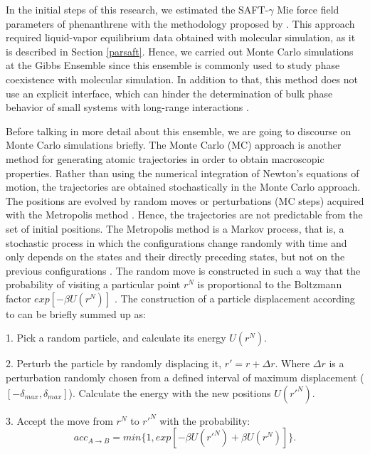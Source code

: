 In the initial steps of this research, we estimated the SAFT-$\gamma$ Mie force field parameters of phenanthrene with the methodology proposed by . This approach required liquid-vapor equilibrium data obtained with molecular simulation, as it is described in Section \ref{parsaft}. Hence, we carried out Monte Carlo simulations at the Gibbs Ensemble \cite{papa1987} since this ensemble is commonly used to study phase coexistence with molecular simulation. In addition to that, this method does not use an explicit interface, which can hinder the determination of bulk phase behavior of small systems with long-range interactions \cite{C1FD00090J}. 

Before talking in more detail about this ensemble, we are going to discourse on Monte Carlo simulations briefly. The Monte Carlo (MC) approach is another method for generating atomic trajectories in order to obtain macroscopic properties. Rather than using the numerical integration of Newton's equations of motion, the trajectories are obtained stochastically in the Monte Carlo approach. The positions are evolved by random moves or perturbations (MC steps) acquired with the Metropolis method \cite{1953JChPh..21.1087M}. Hence, the trajectories are not predictable from the set of initial positions. The Metropolis method is a Markov process, that is, a stochastic process in which the configurations change randomly with time and only depends on the states and their directly preceding states, but not on the previous configurations \cite{raabe}. The random move is constructed in such a way that the probability of visiting a particular point $r^{N}$ is proportional to the Boltzmann factor $exp[-\beta U(r^{N})]$ \cite{frenkel}. The construction of a  particle displacement according to  can be briefly summed up as:

1. Pick a random particle, and calculate its energy $U(r^{N})$.

2. Perturb the particle by randomly displacing  it, $r' = r +\Delta r$. Where $\Delta r$ is a perturbation randomly chosen from a defined interval of maximum displacement ($[- \delta _{max},\delta _{max}]$). Calculate the energy with the new positions $U(r'^{N})$.

3. Accept the move from $r^{N}$ to $r'^{N}$ with the probability:
\begin{equation}
acc_{A \rightarrow B} = min \lbrace 1,exp[-\beta U(r'^{N}) + \beta U(r^{N}) ] \rbrace .
\end{equation}

